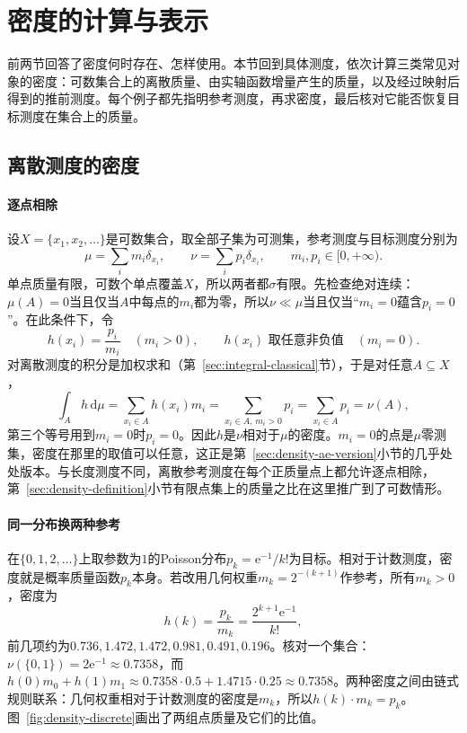 \section{密度的计算与表示}
\label{sec:density-computation}

前两节回答了密度何时存在、怎样使用。本节回到具体测度，依次计算三类常见对象的密度：可数集合上的离散质量、由实轴函数增量产生的质量，以及经过映射后得到的推前测度。每个例子都先指明参考测度，再求密度，最后核对它能否恢复目标测度在集合上的质量。

\subsection{离散测度的密度}
\label{sec:density-discrete}

\paragraph{逐点相除}
设$X=\{x_1,x_2,\dots\}$是可数集合，取全部子集为可测集，参考测度与目标测度分别为
\[
 \mu=\sum_im_i\delta_{x_i},\qquad \nu=\sum_ip_i\delta_{x_i},\qquad m_i,p_i\in[0,+\infty).
\]
单点质量有限，可数个单点覆盖$X$，所以两者都$\sigma$有限。先检查绝对连续：$\mu(A)=0$当且仅当$A$中每点的$m_i$都为零，所以$\nu\ll\mu$当且仅当“$m_i=0$蕴含$p_i=0$”。在此条件下，令
\[
 h(x_i)=\frac{p_i}{m_i}\quad(m_i>0),\qquad h(x_i)\text{ 取任意非负值}\quad(m_i=0).
\]
对离散测度的积分是加权求和（第~\ref{sec:integral-classical}节），于是对任意$A\subseteq X$，
\[
 \int_Ah\,\mathrm d\mu=\sum_{x_i\in A}h(x_i)m_i=\sum_{x_i\in A,\,m_i>0}p_i=\sum_{x_i\in A}p_i=\nu(A),
\]
第三个等号用到$m_i=0$时$p_i=0$。因此$h$是$\nu$相对于$\mu$的密度。$m_i=0$的点是$\mu$零测集，密度在那里的取值可以任意，这正是第~\ref{sec:density-ae-version}小节的几乎处处版本。与长度测度不同，离散参考测度在每个正质量点上都允许逐点相除，第~\ref{sec:density-definition}小节有限点集上的质量之比在这里推广到了可数情形。

\paragraph{同一分布换两种参考}
在$\{0,1,2,\dots\}$上取参数为$1$的Poisson分布$p_k=\mathrm e^{-1}/k!$为目标。相对于计数测度，密度就是概率质量函数$p_k$本身。若改用几何权重$m_k=2^{-(k+1)}$作参考，所有$m_k>0$，密度为
\[
 h(k)=\frac{p_k}{m_k}=\frac{2^{k+1}\mathrm e^{-1}}{k!},
\]
前几项约为$0.736,1.472,1.472,0.981,0.491,0.196$。核对一个集合：$\nu(\{0,1\})=2\mathrm e^{-1}\approx0.7358$，而$h(0)m_0+h(1)m_1\approx0.7358\cdot0.5+1.4715\cdot0.25\approx0.7358$。两种密度之间由链式规则联系：几何权重相对于计数测度的密度是$m_k$，所以$h(k)\cdot m_k=p_k$。图~\ref{fig:density-discrete}画出了两组点质量及它们的比值。

